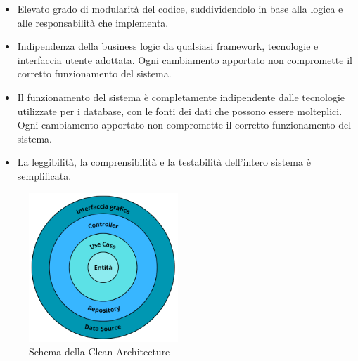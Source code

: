 \begin{itemize}
    \item Elevato grado di modularità del codice, suddividendolo in base alla logica e alle responsabilità che implementa.
    \item Indipendenza della business logic da qualsiasi framework, tecnologie e interfaccia utente adottata. Ogni cambiamento apportato non compromette il corretto funzionamento del sistema.
    \item Il funzionamento del sistema è completamente indipendente dalle tecnologie utilizzate per i database, con le fonti dei dati che possono essere molteplici. Ogni cambiamento apportato non compromette il corretto funzionamento del sistema.
    \item La leggibilità, la comprensibilità e la testabilità dell'intero sistema è semplificata.
\end{itemize}

\begin{figure}[h!]
    \centering  
    \includegraphics[width=0.5\textwidth]{cleanarch.png}
    \caption{Schema della Clean Architecture}
\end{figure}

\newpage